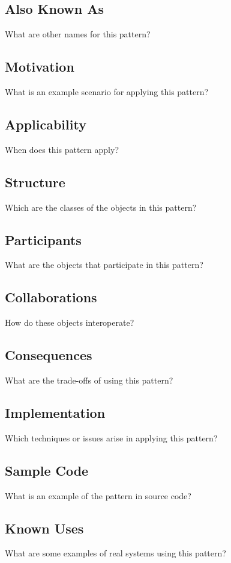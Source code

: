 \documentclass{article}
\begin{document}
\subsection{Also Known As}
What are other names for this pattern?

\subsection{Motivation}
What is an example scenario for applying this pattern?

\subsection{Applicability}
When does this pattern apply?

\subsection{Structure}
Which are the classes of the objects in this pattern?

\subsection{Participants}
What are the objects that participate in this pattern?

\subsection{Collaborations}
How do these objects interoperate?

\subsection{Consequences}
What are the trade-offs of using this pattern?

\subsection{Implementation}
Which techniques or issues arise in applying this pattern?

\subsection{Sample Code}
What is an example of the pattern in source code?

\subsection{Known Uses}
What are some examples of real systems using this pattern?
\end{document}
